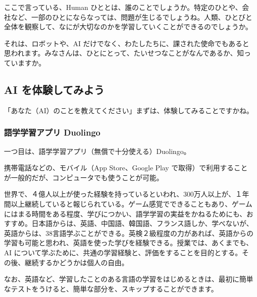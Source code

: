 \documentclass[
]{bxjsbook}
\theoremstyle{definition}
\theoremstyle{definition}
\theoremstyle{definition}
\theoremstyle{definition}
\theoremstyle{remark}
\begin{document}
ここで言っている、Human ひととは、誰のことでしょうか。特定のひとや、会社など、一部のひとにならなっては、問題が生じるでしょうね。人類、ひとびと全体を観察して、なにが大切なのかを学習していくことができるのでしょうか。

それは、ロボットや、AI だけでなく、わたしたちに、課された使命でもあると思われます。みなさんは、ひとにとって、たいせつなことがなんであるか、知っていますか。

\hypertarget{ai-ux3092ux4f53ux9a13ux3057ux3066ux307fux3088ux3046}{%
\subsection{AI を体験してみよう}\label{ai-ux3092ux4f53ux9a13ux3057ux3066ux307fux3088ux3046}}

「あなた（AI）のことを教えてください」まずは、体験してみることですかね。

\hypertarget{ux8a9eux5b66ux5b66ux7fd2ux30a2ux30d7ux30ea-duolingo}{%
\subsubsection{語学学習アプリ Duolingo}\label{ux8a9eux5b66ux5b66ux7fd2ux30a2ux30d7ux30ea-duolingo}}

一つ目は、語学学習アプリ（無償で十分使える）Duolingo。

携帯電話などの、モバイル（App Store、Google Play で取得）で利用することが一般的だが、コンピュータでも使うことが可能。

世界で、４億人以上が使った経験を持っているといわれ、300万人以上が、１年間以上継続していると報じられている。ゲーム感覚でできることもあり、ゲームにはまる時間をある程度、学びにつかい、語学学習の実益をかねるためにも、おすすめ。日本語からは、英語、中国語、韓国語、フランス語しか、学べないが、英語からは、38言語学ぶことができる。英検２級程度の力があれば、英語からの学習も可能と思われ、英語を使った学びを経験できる。授業では、あくまでも、AI について学ぶために、共通の学習経験と、評価をすることを目的とする。その後、継続するかどうかは個人の自由。

なお、英語など、学習したことのある言語の学習をはじめるときは、最初に簡単なテストをうけると、簡単な部分を、スキップすることができます。
\end{document}
